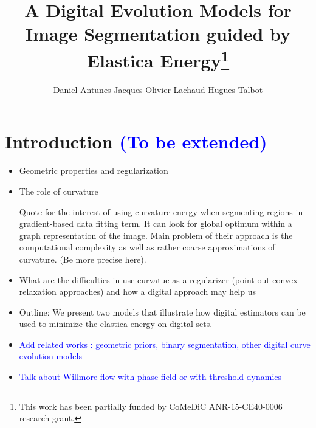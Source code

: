 \documentclass[runningheads]{llncs}
\newcommand{\todo}[1]{{\textcolor{blue}{#1}}}
\newcommand{\jaco}[1]{{\textcolor{green!50!black}{#1}}}
\begin{document}
%
\title{\jaco{A Digital Evolution Models for Image Segmentation guided by Elastica Energy}\thanks{This  work has  been  partially  funded by CoMeDiC ANR-15-CE40-0006 research grant.}}

\author{Daniel Antunes
Jacques-Olivier Lachaud
Hugues Talbot}
%
%
%
\maketitle              %
%
\begin{abstract}

 
\end{abstract}
%
%
%
\setcounter{footnote}{0}
\section{Introduction \todo{(To be extended)}}
\begin{itemize}
	\item{Geometric properties and regularization}
	\item{The role of curvature} 
	
	Quote \cite{schoenemann2011elastic} for the interest of using curvature energy when segmenting regions in gradient-based data fitting term. It can look for global optimum within a graph representation of the image. Main problem of their approach is the computational complexity as well as rather coarse approximations of curvature. (Be more precise here).
	
	\item{What are the difficulties in use curvatue as a regularizer (point out convex relaxation approaches) and how a digital approach may help us }
	\item{Outline: We present two models that illustrate how digital estimators can be used to minimize the elastica energy on digital sets.  }
	\item{\todo{Add related works : geometric priors, binary segmentation, other digital curve evolution models}}
	\item{\todo{Talk about Willmore flow with phase field or with threshold dynamics}}
\end{itemize}
\end{document}
